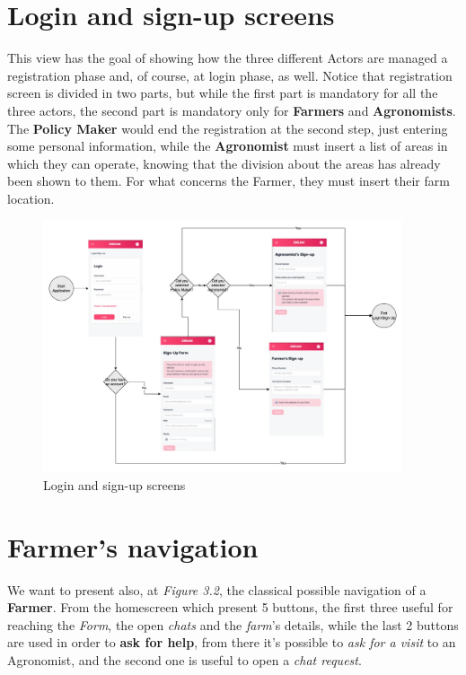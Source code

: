 \documentclass[10pt]{report}
\begin{document}
\section{Login and sign-up screens}
This view has the goal of showing how the three different Actors are managed a registration phase and, of course, at login phase, as well.
Notice that registration screen is divided in two parts, but while the first part is mandatory for all the three actors, the second part is mandatory only for \textbf{Farmers} and \textbf{Agronomists}.    \\
The \textbf{Policy Maker} would end the registration at the second step, just entering some personal information, while the \textbf{Agronomist} must insert a list of areas in which they can operate, knowing that the division about the areas has already been shown to them. For what concerns the Farmer, they must insert their farm location.

\begin{figure}[H]
    \centering
    \includegraphics[width=400px]{Mockups/MockUpDiagram-login_signup.jpg}
    \caption{Login and sign-up screens}
\end{figure}

\section{Farmer's navigation}
We want to present also, at \textit{Figure 3.2}, the classical possible navigation of a \textbf{Farmer}. From the homescreen which present 5 buttons, the first three useful for reaching the \textit{Form}, the open \textit{chats} and the \textit{farm}'s details, while the last 2 buttons are used in order to \textbf{ask for help}, from there it's possible to \textit{ask for a visit} to an Agronomist, and the second one is useful to open a \textit{chat request}. 
\end{document}
